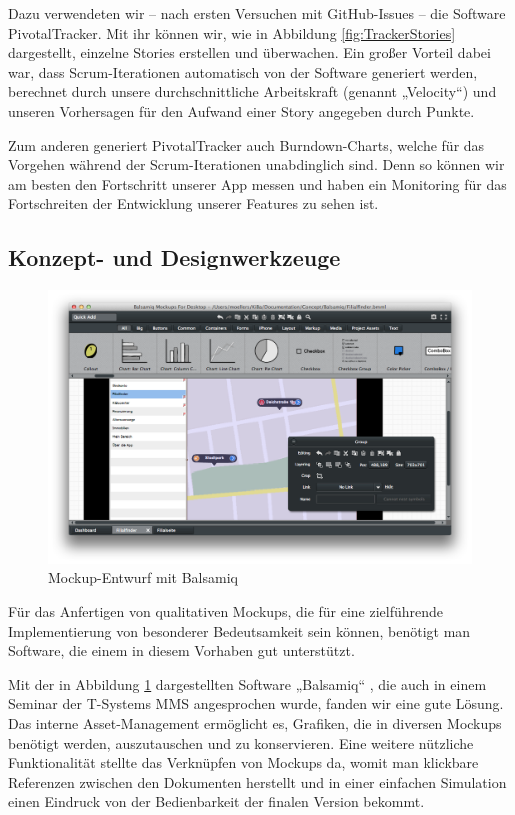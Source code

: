 	Dazu verwendeten wir – nach ersten Versuchen mit GitHub-Issues – die Software PivotalTracker. Mit ihr können wir, wie in Abbildung \ref{fig:TrackerStories} dargestellt, einzelne Stories erstellen und überwachen. Ein großer Vorteil dabei war, dass Scrum-Iterationen automatisch von der Software generiert werden, berechnet durch unsere durchschnittliche Arbeitskraft (genannt „Velocity“) \citep{Podsedly12} und unseren Vorhersagen für den Aufwand einer Story angegeben durch Punkte.

	Zum anderen generiert PivotalTracker auch Burndown-Charts, welche für das Vorgehen während der Scrum-Iterationen unabdinglich sind. Denn so können wir am besten den Fortschritt unserer App messen und haben ein Monitoring für das Fortschreiten der Entwicklung unserer Features zu sehen ist.

\subsection{Konzept- und Designwerkzeuge}
\begin{figure}[hb]
	\centering
	\includegraphics[scale=.3]{Pictures/BalsamiqEntwurf}
	\vspace{-.8cm}
	\caption{Mockup-Entwurf mit Balsamiq\label{fig:BalsamiqEntwurf}}
\end{figure}
	
	Für das Anfertigen von qualitativen Mockups, die für eine zielführende Implementierung von besonderer Bedeutsamkeit sein können, benötigt man Software, die einem in diesem Vorhaben gut unterstützt.
	
	Mit der in Abbildung \ref{fig:BalsamiqEntwurf} dargestellten Software „Balsamiq“ \citep{Balsamiq14}, die auch in einem Seminar der T-Systems MMS angesprochen wurde, fanden wir eine gute Lösung. Das interne Asset-Management ermöglicht es, Grafiken, die in diversen Mockups benötigt werden, auszutauschen und zu konservieren. Eine weitere nützliche Funktionalität stellte das Verknüpfen von Mockups da, womit man klickbare Referenzen zwischen den Dokumenten herstellt und in einer einfachen Simulation einen Eindruck von der Bedienbarkeit der finalen Version bekommt.

